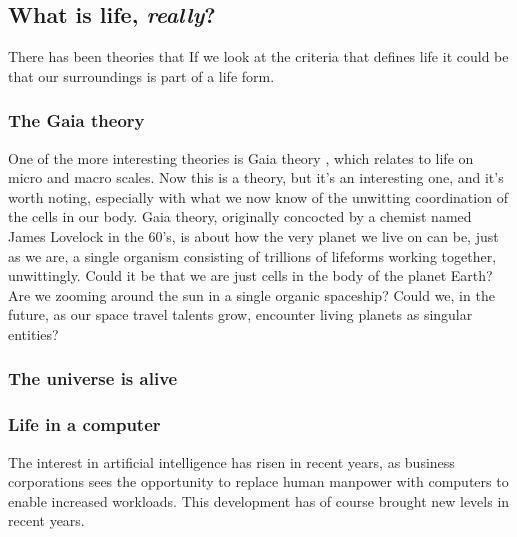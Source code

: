 \subsection*{What is life, \textit{really}?}

There has been theories that 
If we look at the criteria that defines life it could be that our surroundings is part of a life form.

\subsubsection{The Gaia theory}
One of the more interesting theories is Gaia theory \cite{Lovelock}, which relates to life on micro and macro scales. Now this is a theory, but it's an interesting one, and it's worth noting, especially with what we now know of the unwitting coordination of the cells in our body.
Gaia theory, originally concocted by a chemist named James Lovelock in the 60's, is about how the very planet we live on can be, just as we are, a single organism consisting of trillions of lifeforms working together, unwittingly.
Could it be that we are just cells in the body of the planet Earth?
Are we zooming around the sun in a single organic spaceship?
Could we, in the future, as our space travel talents grow, encounter living planets as singular entities?

\subsubsection{The universe is alive}

\subsubsection{Life in a computer}
The interest in artificial intelligence has risen in recent years, as business corporations sees the opportunity to replace human manpower with computers to enable increased workloads.
This development has of course brought  new levels in recent years.